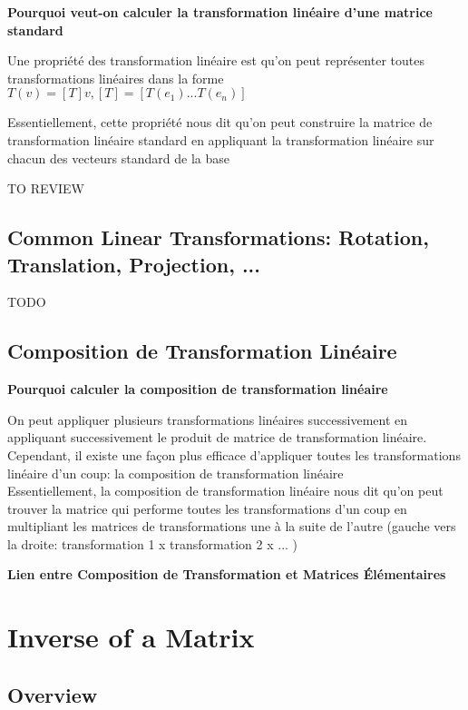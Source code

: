 \documentclass{article}
\begin{document}
\textbf{Pourquoi veut-on calculer la transformation linéaire d'une matrice
standard}

Une propriété des transformation linéaire est qu'on peut représenter toutes
transformations linéaires dans la forme
$ T(v) = [T]v, [T] = [T(e_1) ... T(e_n)] $

Essentiellement, cette propriété nous dit qu'on peut construire la matrice
de transformation linéaire standard en appliquant la transformation linéaire
sur chacun des vecteurs standard de la base

\begin{intuition}
    TO REVIEW
\end{intuition}


\subsection{Common Linear Transformations: Rotation, Translation, Projection, ...}

TODO

\subsection{Composition de Transformation Linéaire}

\textbf{Pourquoi calculer la composition de transformation linéaire}

On peut appliquer plusieurs transformations linéaires successivement en
appliquant successivement le produit de matrice de transformation linéaire.
Cependant, il existe une façon plus efficace d'appliquer toutes les
transformations linéaire d'un coup: la composition de transformation linéaire\\

Essentiellement, la composition de transformation linéaire nous dit qu'on peut
trouver la matrice qui performe toutes les transformations d'un coup en
multipliant les matrices de transformations une à la suite de l'autre (gauche
vers la droite: transformation 1 x transformation 2 x ... )

\textbf{Lien entre Composition de Transformation et Matrices Élémentaires}

\section{Inverse of a Matrix}

\subsection{Overview}%
\label{sub:Overview}
\end{document}
